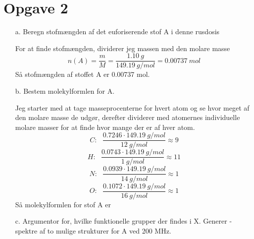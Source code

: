 \documentclass[12pt]{article}
\begin{document}
\begin{enumerate}
\end{enumerate}

\section*{Opgave 2}

\begin{enumerate}

        \item[a.] Beregn stofmængden af det euforiserende stof A i denne
                rusdosis

                For at finde stofmængden, dividerer jeg massen med den
                molare masse
                $$n(A) = \frac{m}{M} = \frac{1.10\ g}{149.19\ g/mol} = 0.00737\ mol$$
                Så stofmængden af stoffet A er 0.00737 mol.

        \item[b.] Bestem molekylformlen for A.

                Jeg starter med at tage masseprocenterne for hvert atom
                og se hvor meget af den molare masse de udgør, derefter
                dividerer med atomernes individuelle molare masser for at
                finde hvor mange der er af hver atom.
                $$C:~~~\frac{0.7246\cdot 149.19\ g/mol}{12\ g/mol} \approx 9$$
                $$H:~~~\frac{0.0743\cdot 149.19\ g/mol}{1\ g/mol} \approx 11$$
                $$N:~~~\frac{0.0939\cdot 149.19\ g/mol}{14\ g/mol} \approx 1$$
                $$O:~~~\frac{0.1072\cdot 149.19\ g/mol}{16\ g/mol} \approx 1$$
                Så molekylformlen for stof A er 

        \item[c.] Argumentor for, hvilke funktionelle grupper der findes
                i X. Generer -spektre af to mulige strukturer for
                A ved 200 MHz.


\end{enumerate}
\end{document}
